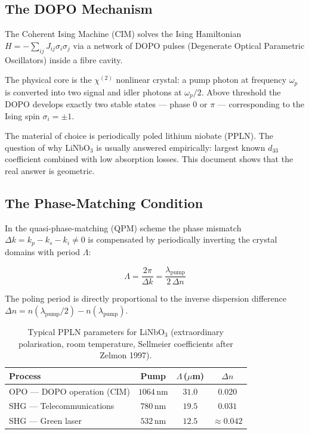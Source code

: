 \subsection{The DOPO Mechanism}

The Coherent Ising Machine (CIM) solves the Ising Hamiltonian
$H = -\sum_{ij} J_{ij}\sigma_i\sigma_j$ via a network of DOPO pulses
(Degenerate Optical Parametric Oscillators) inside a fibre cavity.

The physical core is the $\chi^{(2)}$ nonlinear crystal: a pump photon at
frequency $\omega_p$ is converted into two signal and idler photons at
$\omega_p/2$. Above threshold the DOPO develops exactly two stable states
— phase 0 or $\pi$ — corresponding to the Ising spin $\sigma_i = \pm 1$.

The material of choice is periodically poled lithium niobate (PPLN). The
question of why LiNbO$_3$ is usually answered empirically: largest known
$d_{33}$ coefficient combined with low absorption losses. This document
shows that the real answer is geometric.

\subsection{The Phase-Matching Condition}

In the quasi-phase-matching (QPM) scheme the phase mismatch
$\Delta k = k_p - k_s - k_i \neq 0$ is compensated by periodically
inverting the crystal domains with period $\Lambda$:

\begin{equation}
    \Lambda = \frac{2\pi}{\Delta k} = \frac{\lambda_{\text{pump}}}{2\,\Delta n}
    \label{eq:poling}
\end{equation}

The poling period is directly proportional to the inverse dispersion
difference $\Delta n = n(\lambda_{\text{pump}}/2) - n(\lambda_{\text{pump}})$.

\begin{table}[H]
    \centering
    \begin{tabular}{lccc}
        \toprule
        \textbf{Process} & \textbf{Pump} &
        \textbf{$\Lambda$\,($\mu$m)} & \textbf{$\Delta n$} \\
        \midrule
        OPO — DOPO operation (CIM)  & $1064\,\text{nm}$ & $31.0$ & $0.020$ \\
        SHG — Telecommunications    & $780\,\text{nm}$  & $19.5$ & $0.031$ \\
        SHG — Green laser           & $532\,\text{nm}$  & $12.5$ & $\approx 0.042$ \\
        \bottomrule
    \end{tabular}
    \caption{Typical PPLN parameters for LiNbO$_3$ (extraordinary polarisation,
    room temperature, Sellmeier coefficients after Zelmon 1997).}
    \label{tab:ppln}
\end{table}

